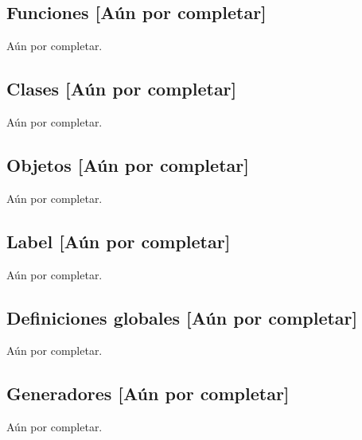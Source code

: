 \subsection {Funciones [Aún por completar]}
Aún por completar.
\subsection {Clases [Aún por completar]}
Aún por completar.
\subsection {Objetos [Aún por completar]}
Aún por completar.
\subsection {Label [Aún por completar]}
Aún por completar.
\subsection {Definiciones globales [Aún por completar]}
Aún por completar.
\subsection {Generadores [Aún por completar]}
Aún por completar.
